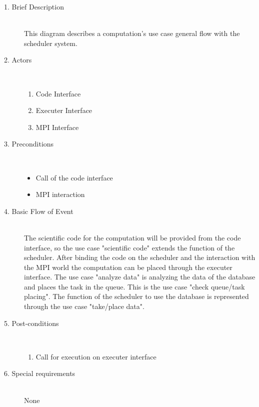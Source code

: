 	\begin{description}
\item [1. Brief Description]\hfill \\
This diagram describes a computation's use case general flow with the scheduler system.

\item [2. Actors]\hfill \\
\vspace{-6.5mm}
	\begin{enumerate}
		\item Code Interface
		\item Executer Interface
		\item MPI Interface
	\end{enumerate}

\newpage
\item [3. Preconditions]\hfill \\
\vspace{-6.5mm}
\begin{itemize}
\item Call of the code interface
\item MPI interaction

\end{itemize}

\item [4. Basic Flow of Event]\hfill \\
The scientific code for the computation will be provided from the code interface, so the use case "scientific code" extends the function of the scheduler. After binding the code on the scheduler and the interaction with the MPI world the computation can be placed through the executer interface. The use case "analyze data" is analyzing the data of the database and places the task in the queue. This is the use case "check queue/task placing". The function of the scheduler to use the database is represented through the use case "take/place data".


\item [5. Post-conditions]\hfill \\
\vspace{-6.5mm}
\begin{enumerate}
\item Call for execution on executer interface
\end{enumerate}

\item [6. Special requirements]\hfill \\
\vspace{-6.5mm}
None

\end{description}

